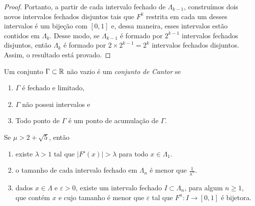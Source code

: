 \begin{proof}
Portanto, a partir de cada intervalo fechado de $\Lambda_{k-1}$, construímos dois novos intervalos fechados disjuntos tais que $F^k$ restrita em cada um desses intervalos é um bijeção com $[0, 1]$ e, dessa maneira, esses intervalos estão contidos em $\Lambda_k$. Desse modo, se $\Lambda_{k-1}$ é formado por $2^{k-1}$ intervalos fechados disjuntos, então $\Lambda_k$ é formado por $2 \times 2^{k-1} = 2^k$ intervalos fechados disjuntos. Assim, o resultado está provado.
\end{proof}


\begin{definition}
Um conjunto $\Gamma \subset \mathbb{R}$ não vazio é um \textit{conjunto de Cantor} se
\begin{enumerate}
\item $\Gamma$ é fechado e limitado,
\item $\Gamma$ não possui intervalos e
\item Todo ponto de $\Gamma$ é um ponto de acumulação de $\Gamma$.
\end{enumerate}
\end{definition}


\begin{lemma}
\label{lema conjuntosdecantor 1}
Se $\mu > 2 + \sqrt{5}$, então
\begin{enumerate}
\item  existe $\lambda > 1$ tal que $|F'(x)| > \lambda$ para todo $x \in \Lambda_1$.
\item o tamanho de cada intervalo fechado em $\Lambda_n$ é menor que $\frac{1}{\lambda^n}$.
\item dados $x \in \Lambda$ e $\varepsilon > 0$, existe um intervalo fechado $I \subset \Lambda_n$, para algum $n \geq 1$,  que contém $x$ e cujo tamanho é menor que $\varepsilon$ tal que $F^n: I \to [0,1]$ é bijetora.
\end{enumerate}
\end{lemma}

